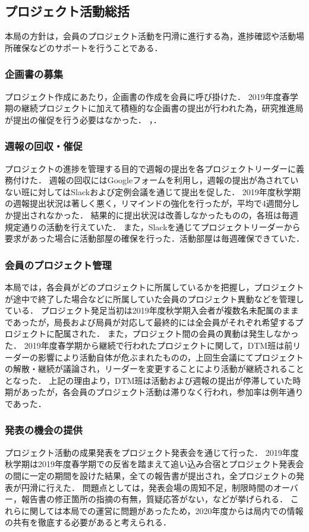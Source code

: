 \subsection*{プロジェクト活動総括}

本局の方針は，会員のプロジェクト活動を円滑に進行する為，進捗確認や活動場所確保などのサポートを行うことである．

\subsubsection*{企画書の募集}
	
プロジェクト作成にあたり，企画書の作成を会員に呼び掛けた．
2019年度春学期の継続プロジェクトに加えて積極的な企画書の提出が行われた為，研究推進局が提出の催促を行う必要はなかった．
，．

\subsubsection*{週報の回収・催促}

プロジェクトの進捗を管理する目的で週報の提出を各プロジェクトリーダーに義務付けた．
週報の回収にはGoogleフォームを利用し，週報の提出が為されていない班に対してはSlackおよび定例会議を通じて提出を促した．
2019年度秋学期の週報提出状況は著しく悪く，リマインドの強化を行ったが，平均で4週間分しか提出されなかった．
結果的に提出状況は改善しなかったものの，各班は毎週規定通りの活動を行えていた．
また，Slackを通じてプロジェクトリーダーから要求があった場合に活動部屋の確保を行った．活動部屋は毎週確保できていた．

\subsubsection*{会員のプロジェクト管理}

本局では，各会員がどのプロジェクトに所属しているかを把握し，プロジェクトが途中で終了した場合などに所属していた会員のプロジェクト異動などを管理している．
プロジェクト発足当初は2019年度秋学期入会者が複数名未配属のままであったが，局長および局員が対応して最終的には全会員がそれぞれ希望するプロジェクトに配属された．
また，プロジェクト間の会員の異動は発生しなかった．
2019年度春学期から継続で行われたプロジェクトに関して，DTM班は前リーダーの影響により活動自体が危ぶまれたものの，上回生会議にてプロジェクトの解散・継続が議論され，リーダーを変更することにより活動が継続されることとなった．
上記の理由より，DTM班は活動および週報の提出が停滞していた時期があったが，各会員のプロジェクト活動は滞りなく行われ，参加率は例年通りであった．

\subsubsection*{発表の機会の提供}

プロジェクト活動の成果発表をプロジェクト発表会を通じて行った．
2019年度秋学期は2019年度春学期での反省を踏まえて追い込み合宿とプロジェクト発表会の間に一定の期間を設けた結果，全ての報告書が提出され，全プロジェクトの発表が円滑に行えた．
問題点としては，発表会場の周知不足，制限時間のオーバー，報告書の修正箇所の指摘の有無，質疑応答がない，などが挙げられる．
これらに関しては本局での運営に問題があったため，2020年度からは局内での情報の共有を徹底する必要があると考えられる．